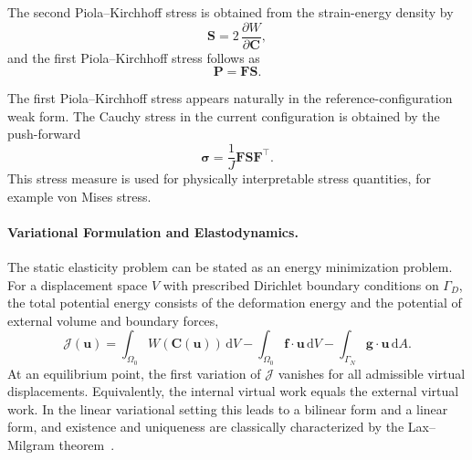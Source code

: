 The second Piola--Kirchhoff stress is obtained from the strain-energy density by
\begin{equation}
    \mathbf{S}
    =
    2\,\frac{\partial W}{\partial \mathbf{C}},
    \label{eq:fem_pk2}
\end{equation}
and the first Piola--Kirchhoff stress follows as
\begin{equation}
    \mathbf{P} = \mathbf{F}\mathbf{S}.
    \label{eq:fem_pk1}
\end{equation}

The first Piola--Kirchhoff stress appears naturally in the reference-configuration weak form.
The Cauchy stress in the current configuration is obtained by the push-forward
\begin{equation}
    \boldsymbol{\sigma}
    =
    \frac{1}{J}\mathbf{F}\mathbf{S}\mathbf{F}^{\top}.
    \label{eq:fem_cauchy_stress}
\end{equation}
This stress measure is used for physically interpretable stress quantities, for example von Mises stress.

\paragraph{Variational Formulation and Elastodynamics.}
The static elasticity problem can be stated as an energy minimization problem.
For a displacement space $V$ with prescribed Dirichlet boundary conditions on $\Gamma_D$, the total potential energy consists of the deformation energy and the potential of external volume and boundary forces,
\begin{equation}
    \mathcal{J}(\mathbf{u})
    =
    \int_{\Omega_0} W(\mathbf{C}(\mathbf{u}))\,\mathrm{d}V
    -
    \int_{\Omega_0} \mathbf{f}\cdot\mathbf{u}\,\mathrm{d}V
    -
    \int_{\Gamma_N} \mathbf{g}\cdot\mathbf{u}\,\mathrm{d}A .
    \label{eq:fem_total_energy}
\end{equation}
At an equilibrium point, the first variation of $\mathcal{J}$ vanishes for all admissible virtual displacements.
Equivalently, the internal virtual work equals the external virtual work.
In the linear variational setting this leads to a bilinear form and a linear form, and existence and uniqueness are classically characterized by the Lax--Milgram theorem~\cite{kochmann_introduction_2025}.

